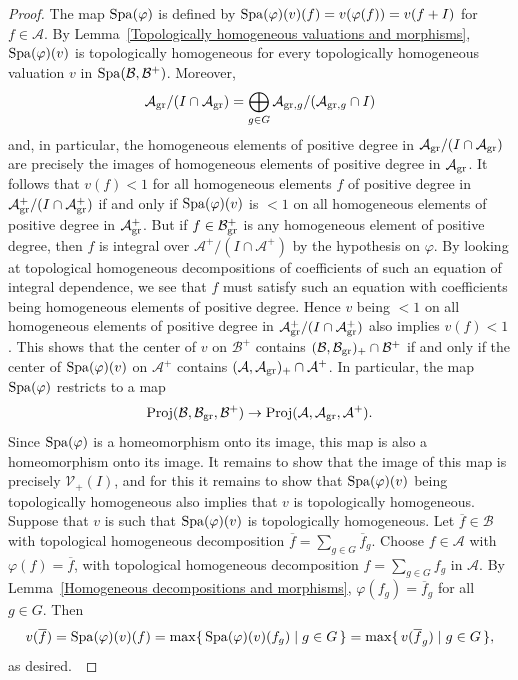 \documentclass[12pt,twoside,a4paper]{article}
\theoremstyle{definition}
\theoremstyle{remark}
\newcommand\gr{{\rm gr}}
\newcommand\Proj{{\rm Proj}}
\newcommand\Spa{{\rm Spa}}
\begin{document}
\begin{proof}The map $\Spa(\varphi)$ is defined by $\Spa(\varphi)(v)(f)=v(\varphi(f))=v(f+I)$ for $f\in \mathcal{A}$. By Lemma~\ref{Topologically homogeneous valuations and morphisms}, $\Spa(\varphi)(v)$ is topologically homogeneous for every topologically homogeneous valuation $v$ in $\Spa(\mathcal{B}, \mathcal{B}^{+})$. Moreover, \begin{equation*}\mathcal{A}_{\gr}/(I\cap \mathcal{A}_{\gr})=\bigoplus_{g\in G}\mathcal{A}_{\gr, g}/(\mathcal{A}_{\gr, g}\cap I)\end{equation*}and, in particular, the homogeneous elements of positive degree in $\mathcal{A}_{\gr}/(I\cap \mathcal{A}_{\gr})$ are precisely the images of homogeneous elements of positive degree in $\mathcal{A}_{\gr}$. It follows that $v(f)<1$ for all homogeneous elements $f$ of positive degree in $\mathcal{A}_{\gr}^{+}/(I\cap \mathcal{A}_{\gr}^{+})$ if and only if $\Spa(\varphi)(v)$ is $<1$ on all homogeneous elements of positive degree in $\mathcal{A}_{\gr}^{+}$. But if $f\in \mathcal{B}_{\gr}^{+}$ is any homogeneous element of positive degree, then $f$ is integral over $\mathcal{A}^{+}/(I\cap \mathcal{A}^{+})$ by the hypothesis on $\varphi$. By looking at topological homogeneous decompositions of coefficients of such an equation of integral dependence, we see that $f$ must satisfy such an equation with coefficients being homogeneous elements of positive degree. Hence $v$ being $<1$ on all homogeneous elements of positive degree in $\mathcal{A}_{\gr}^{+}/(I\cap \mathcal{A}_{\gr}^{+})$ also implies $v(f)<1$. This shows that the center of $v$ on $\mathcal{B}^{+}$ contains $(\mathcal{B}, \mathcal{B}_{\gr})_{+}\cap \mathcal{B}^{+}$ if and only if the center of $\Spa(\varphi)(v)$ on $\mathcal{A}^{+}$ contains $(\mathcal{A}, \mathcal{A}_{\gr})_{+}\cap \mathcal{A}^{+}$. In particular, the map $\Spa(\varphi)$ restricts to a map \begin{equation*}\Proj(\mathcal{B}, \mathcal{B}_{\gr}, \mathcal{B}^{+})\to \Proj(\mathcal{A}, \mathcal{A}_{\gr}, \mathcal{A}^{+}).\end{equation*}Since $\Spa(\varphi)$ is a homeomorphism onto its image, this map is also a homeomorphism onto its image. It remains to show that the image of this map is precisely $\mathcal{V}_{+}(I)$, and for this it remains to show that $\Spa(\varphi)(v)$ being topologically homogeneous also implies that $v$ is topologically homogeneous. Suppose that $v$ is such that $\Spa(\varphi)(v)$ is topologically homogeneous. Let $\overline{f}\in \mathcal{B}$ with topological homogeneous decomposition $\overline{f}=\sum_{g\in G}\overline{f}_{g}$. Choose $f\in \mathcal{A}$ with $\varphi(f)=\overline{f}$, with topological homogeneous decomposition $f=\sum_{g\in G}f_{g}$ in $\mathcal{A}$. By Lemma~\ref{Homogeneous decompositions and morphisms}, $\varphi(f_{g})=\overline{f}_{g}$ for all $g\in G$. Then \begin{equation*}v(\overline{f})=\Spa(\varphi)(v)(f)=\max\{\, \Spa(\varphi)(v)(f_{g})\mid g\in G\,\}=\max\{\, v(\overline{f}_{g})\mid g\in G\,\},\end{equation*}as desired. \end{proof}
\end{document}
